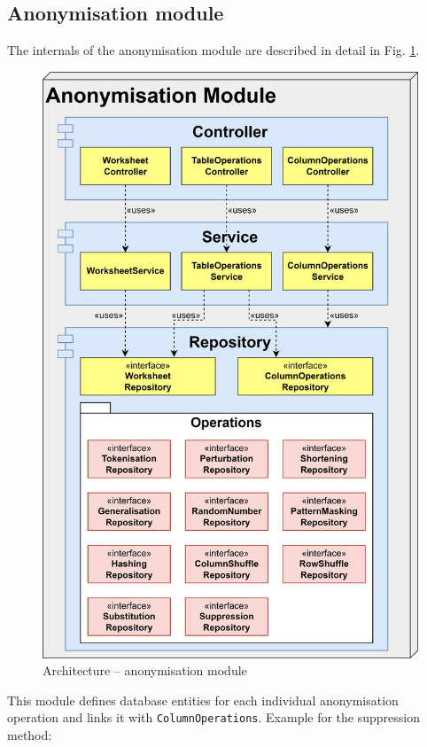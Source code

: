\documentclass[a4paper,twoside,12pt]{book}
\begin{document}
\subsection{Anonymisation module}

The internals of the anonymisation module are described in detail in Fig. \ref{fig:architecture_anonymisation}.
%
\begin{figure}
  \centering
  \includegraphics[width=\linewidth]{img/architecture_anonymisation.png}
  \caption{Architecture – anonymisation module}
  \label{fig:architecture_anonymisation}
\end{figure}
%
This module defines database entities for each individual anonymisation operation and links it with \texttt{ColumnOperations}. Example for the suppression method:
\end{document}
